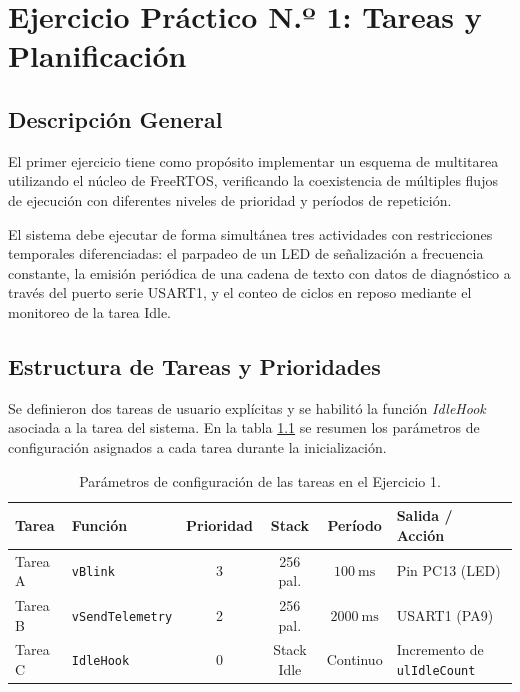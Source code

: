 \chapter{Ejercicio Práctico N.º 1: Tareas y Planificación}
\label{sec.ej1:planificacion}

\section{Descripción General}

El primer ejercicio tiene como propósito implementar un esquema de multitarea utilizando el núcleo de FreeRTOS,
verificando la coexistencia de múltiples flujos de ejecución con diferentes niveles de prioridad y períodos de
repetición.

El sistema debe ejecutar de forma simultánea tres actividades con restricciones temporales diferenciadas:
el parpadeo de un LED de señalización a frecuencia constante, la emisión periódica de una cadena de texto con datos
de diagnóstico a través del puerto serie USART1, y el conteo de ciclos en reposo mediante el monitoreo
de la tarea Idle.

\section{Estructura de Tareas y Prioridades}

Se definieron dos tareas de usuario explícitas y se habilitó la función \textit{IdleHook} asociada a la tarea del
sistema. En la tabla \ref{tab.ej1:tareas} se resumen los parámetros de configuración asignados a cada tarea durante la
inicialización.

\begin{table}[!ht]
\centering
\small
\caption{Parámetros de configuración de las tareas en el Ejercicio 1.}
\label{tab.ej1:tareas}
\begin{tabular}{llcccl}
\toprule
Tarea & Función & Prioridad & Stack & Período & Salida / Acción \\
\midrule
Tarea A & \texttt{vBlink} & 3 & 256 pal. & $\SI{100}{\milli\second}$ & Pin PC13 (LED) \\
Tarea B & \texttt{vSendTelemetry} & 2 & 256 pal. & $\SI{2000}{\milli\second}$ & USART1 (PA9) \\
Tarea C & \texttt{IdleHook} & 0 & Stack Idle & Continuo & Incremento de \texttt{ulIdleCount} \\
\bottomrule
\end{tabular}
\end{table}

